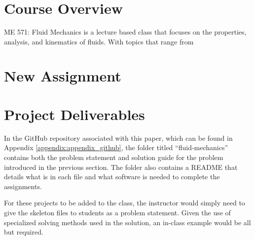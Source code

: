 \section{Course Overview}

ME 571: Fluid Mechanics is a lecture based class that focuses on the properties, analysis, 
and kinematics of fluids. With topics that range from 

\section{New Assignment}



\section{Project Deliverables}

In the GitHub repository associated with this paper, which can be found in 
Appendix \ref{appendix:appendix_github}, the folder titled ``fluid-mechanics''
contains both the problem statement and solution guide for the problem introduced in 
the previous section. The folder also contains a README that details what is in each file and 
what software is needed to complete the assignments. 

For these projects to be added to the class, the instructor would simply need to give the 
skeleton files to students as a problem statement. Given the use of specialized solving
methods used in the solution, an in-class example would be all but required.
